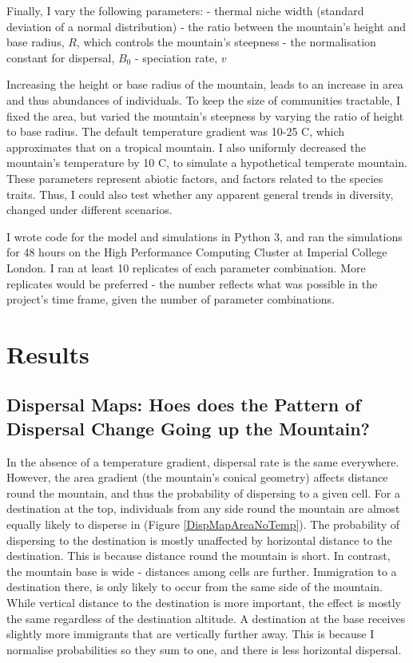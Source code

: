 \documentclass[11pt]{article}
\begin{document}
Finally, I vary the following parameters:
- thermal niche width (standard deviation of a normal distribution)
- the ratio between the mountain's height and base radius, $R$, which controls the mountain's steepness
- the normalisation constant for dispersal, $B_0$
- speciation rate, $v$

Increasing the height or base radius of the mountain, leads to an increase in area and thus abundances of individuals. To keep the size of communities tractable, I fixed the area, but varied the mountain's steepness by varying the ratio of height to base radius. The default temperature gradient was 10-25 \degree C, which approximates that on a tropical mountain. I also uniformly decreased the mountain's temperature by 10 \degree C, to simulate a hypothetical temperate mountain. These parameters represent abiotic factors, and factors related to the species traits. Thus, I could also test whether any apparent general trends in diversity, changed under different scenarios.

I wrote code for the model and simulations in Python 3, and ran the simulations for 48 hours on the High Performance Computing Cluster at Imperial College London. I ran at least 10 replicates of each parameter combination. More replicates would be preferred - the number reflects what was possible in the project's time frame, given the number of parameter combinations.


\section*{Results}
\subsection*{Dispersal Maps: Hoes does the Pattern of Dispersal Change Going up the Mountain?}
In the absence of a temperature gradient, dispersal rate is the same everywhere. However, the area gradient (the mountain's conical geometry) affects distance round the mountain, and thus the probability of dispersing to a given cell. For a destination at the top, individuals from any side round the mountain are almost equally likely to disperse in (Figure \ref{DispMapAreaNoTemp}). The probability of dispersing to the destination is mostly unaffected by horizontal distance to the destination. This is because distance round the mountain is short. In contrast, the mountain base is wide - distances among cells are further. Immigration to a destination there, is only likely to occur from the same side of the mountain. While vertical distance to the destination is more important, the effect is mostly the same regardless of the destination altitude. A destination at the base receives slightly more immigrants that are vertically further away. This is because I normalise probabilities so they sum to one, and there is less horizontal dispersal.
\end{document}
